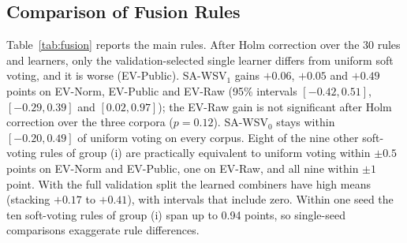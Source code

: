\documentclass[conference,a4paper]{IEEEtran}
\newcommand{\rcz}{SA\mbox{-}WSV$_0$}
\newcommand{\rco}{SA\mbox{-}WSV$_1$}
\begin{document}
\subsection{Comparison of Fusion Rules}
Table~\ref{tab:fusion} reports the main rules. After Holm correction over the 30 rules and learners, only the validation-selected single learner differs from uniform soft voting, and it is worse (EV-Public). \rco{} gains $+0.06$, $+0.05$ and $+0.49$ points on EV-Norm, EV-Public and EV-Raw (95\% intervals $[-0.42, 0.51]$, $[-0.29, 0.39]$ and $[0.02, 0.97]$); the EV-Raw gain is not significant after Holm correction over the three corpora ($p=0.12$). \rcz{} stays within $[-0.20, 0.49]$ of uniform voting on every corpus. Eight of the nine other soft-voting rules of group (i) are practically equivalent to uniform voting within $\pm0.5$ points on EV-Norm and EV-Public, one on EV-Raw, and all nine within $\pm1$ point. With the full validation split the learned combiners have high means (stacking $+0.17$ to $+0.41$), with intervals that include zero. Within one seed the ten soft-voting rules of group (i) span up to 0.94 points, so single-seed comparisons exaggerate rule differences.
\end{document}
